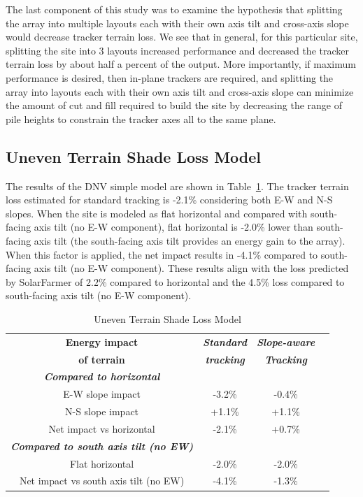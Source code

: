 \documentclass[conference]{IEEEtran}
\begin{document}
The last component of this study was to examine the hypothesis that splitting the array into multiple layouts each with their own axis tilt and cross-axis slope would decrease tracker terrain loss. We see that in general, for this particular site, splitting the site into 3 layouts increased performance and decreased the tracker terrain loss by about half a percent of the output. More importantly, if maximum performance is desired, then in-plane trackers are required, and splitting the array into layouts each with their own axis tilt and cross-axis slope can minimize the amount of cut and fill required to build the site by decreasing the range of pile heights to constrain the tracker axes all to the same plane.

\subsection{Uneven Terrain Shade Loss Model}
The results of the DNV simple model are shown in Table~\ref{table:uneven-terrain}. The tracker terrain loss estimated for standard tracking is -2.1\% considering both E-W and N-S slopes. When the site is modeled as flat horizontal and compared with south-facing axis tilt (no E-W component), flat horizontal is -2.0\% lower than south-facing axis tilt (the south-facing axis tilt provides an energy gain to the array). When this factor is applied, the net impact results in -4.1\% compared to south-facing axis tilt (no E-W component). These results align with the loss predicted by SolarFarmer of 2.2\% compared to horizontal and the 4.5\% loss compared to south-facing axis tilt (no E-W component).

\begin{table}[htbp]
\caption{Uneven Terrain Shade Loss Model}
\begin{center}
\begin{tabular}{|c|c|c|c|}
\hline
\textbf{Energy impact}& \textbf{\textit{Standard}}& \textbf{\textit{Slope-aware}} \\
\textbf{of terrain}   & \textbf{\textit{tracking}} & \textbf{\textit{Tracking}} \\
\hline
\textbf{\textit{Compared to horizontal}} & & \\
\hline
E-W slope impact & -3.2\% & -0.4\% \\
\hline
N-S slope impact  & +1.1\% & +1.1\% \\
\hline
Net impact vs horizontal & -2.1\% & +0.7\% \\
\hline
\textbf{\textit{Compared to south axis tilt (no EW)}} & & \\
\hline
Flat horizontal & -2.0\% & -2.0\% \\
\hline
Net impact vs south axis tilt (no EW) & -4.1\% & -1.3\% \\
\hline
\end{tabular}
\label{table:uneven-terrain}
\end{center}
\end{table}
\end{document}
